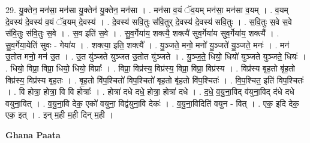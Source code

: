 \documentclass[17pt]{extarticle}
\begin{document}
29. यु॒क्तेन॒ मन॑सा॒ मन॑सा यु॒क्तेन॑ यु॒क्तेन॒ मन॑सा । . मन॑सा व॒यं ॅव॒यम् मन॑सा॒ मन॑सा व॒यम् । . व॒यम् दे॒वस्य॑ दे॒वस्य॑ व॒यं ॅव॒यम् दे॒वस्य॑ । . दे॒वस्य॑ सवि॒तुः स॑वि॒तुर् दे॒वस्य॑ दे॒वस्य॑ सवि॒तुः । . स॒वि॒तुः स॒वे स॒वे स॑वि॒तुः स॑वि॒तुः स॒वे । . स॒व इति॑ स॒वे । . सु॒व॒र्गेया॑य॒ शक्त्यै॒ शक्त्यै॑ सुव॒र्गेया॑य सुव॒र्गेया॑य॒ शक्त्यै᳚ । . सु॒व॒र्गेया॒येति॑ सुवः - गेया॑य । . शक्त्या॒ इति॒ शक्त्यै᳚ । . यु॒ञ्जते॒ मनो॒ मनो॑ यु॒ञ्जते॑ यु॒ञ्जते॒ मनः॑ । . मन॑ उ॒तोत मनो॒ मन॑ उ॒त । . उ॒त यु॑ञ्जते युञ्जत उ॒तोत यु॑ञ्जते । . यु॒ञ्ज॒ते॒ धियो॒ धियो॑ युञ्जते युञ्जते॒ धियः॑ । . धियो॒ विप्रा॒ विप्रा॒ धियो॒ धियो॒ विप्राः᳚ । . विप्रा॒ विप्र॑स्य॒ विप्र॑स्य॒ विप्रा॒ विप्रा॒ विप्र॑स्य । . विप्र॑स्य बृह॒तो बृ॑ह॒तो विप्र॑स्य॒ विप्र॑स्य बृह॒तः । . बृ॒ह॒तो वि॑प॒श्चितो॑ विप॒श्चितो॑ बृह॒तो बृ॑ह॒तो वि॑प॒श्चितः॑ । . वि॒प॒श्चित॒ इति॑ विप॒श्चितः॑ । . वि होत्रा॒ होत्रा॒ वि वि होत्राः᳚ । . होत्रा॑ दधे दधे॒ होत्रा॒ होत्रा॑ दधे । . द॒धे॒ व॒यु॒ना॒विद् व॑युना॒विद् द॑धे दधे वयुना॒वित् । . व॒यु॒ना॒वि देक॒ एको॑ वयुना॒ विद्व॑युना॒वि देकः॑ । . व॒यु॒ना॒विदिति॑ वयुन - वित् । . एक॒ इदि देक॒ एक॒ इत् । . इन् म॒ही म॒ही दिन् म॒ही । \newline

\textbf{Ghana Paata } \newline
\end{document}
